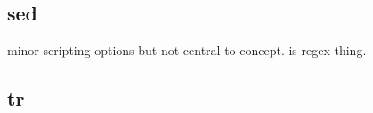
\subsection{sed}
 
minor scripting options but not central to concept. is regex thing.

\subsection{tr}